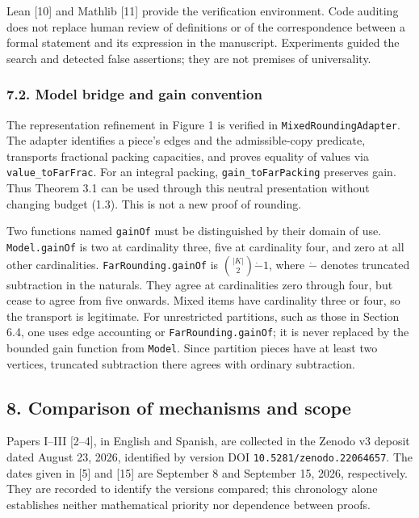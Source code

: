 \documentclass[english,11pt,a4paper]{article}
\begin{document}
Lean {[}10{]} and Mathlib {[}11{]} provide the verification environment. Code auditing does not replace human review of definitions or of the correspondence between a formal statement and its expression in the manuscript. Experiments guided the search and detected false assertions; they are not premises of universality.

\subsubsection{7.2. Model bridge and gain convention}\label{model-bridge-and-gain-convention}

The representation refinement in Figure 1 is verified in \nolinkurl{MixedRoundingAdapter}. The adapter identifies a piece's edges and the admissible-copy predicate, transports fractional packing capacities, and proves equality of values via \nolinkurl{value_toFarFrac}. For an integral packing, \nolinkurl{gain_toFarPacking} preserves gain. Thus Theorem 3.1 can be used through this neutral presentation without changing budget (1.3). This is not a new proof of rounding.

Two functions named \nolinkurl{gainOf} must be distinguished by their domain of use. \nolinkurl{Model.gainOf} is two at cardinality three, five at cardinality four, and zero at all other cardinalities. \nolinkurl{FarRounding.gainOf} is \(\binom{|K|}{2}\mathbin{\dot-}1\), where \(\dot-\) denotes truncated subtraction in the naturals. They agree at cardinalities zero through four, but cease to agree from five onwards. Mixed items have cardinality three or four, so the transport is legitimate. For unrestricted partitions, such as those in Section 6.4, one uses edge accounting or \nolinkurl{FarRounding.gainOf}; it is never replaced by the bounded gain function from \nolinkurl{Model}. Since partition pieces have at least two vertices, truncated subtraction there agrees with ordinary subtraction.

\subsection{8. Comparison of mechanisms and scope}\label{comparison-of-mechanisms-and-scope}

Papers I--III {[}2--4{]}, in English and Spanish, are collected in the Zenodo v3 deposit dated August 23, 2026, identified by version DOI \nolinkurl{10.5281/zenodo.22064657}. The dates given in {[}5{]} and {[}15{]} are September 8 and September 15, 2026, respectively. They are recorded to identify the versions compared; this chronology alone establishes neither mathematical priority nor dependence between proofs.
\end{document}
